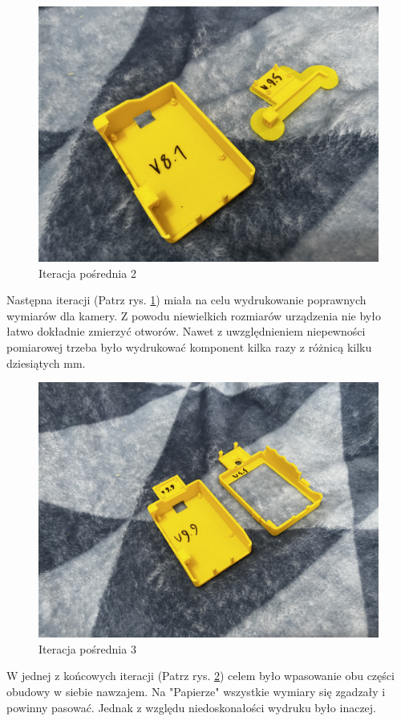 \documentclass[a4paper,12pt,reqno]{article}
\begin{document}
\begin{figure}[H]%
\centering
\includegraphics[width=0.8\columnwidth]{imgs/print_2.jpg}
\caption{Iteracja pośrednia 2 \label{PDCA_02}}
\quad
\end{figure}

Następna iteracji (Patrz rys. \ref{PDCA_02}) miała na celu wydrukowanie poprawnych wymiarów dla kamery. Z powodu niewielkich rozmiarów urządzenia nie było łatwo dokładnie zmierzyć otworów. Nawet z uwzględnieniem niepewności pomiarowej trzeba było wydrukować komponent kilka razy z różnicą kilku dziesiątych mm.

\begin{figure}[H]%
\centering
\includegraphics[width=0.8\columnwidth]{imgs/print_3.jpg}
\caption{Iteracja pośrednia 3 \label{PDCA_03}}
\quad
\end{figure}

W jednej z końcowych iteracji (Patrz rys. \ref{PDCA_03}) celem było wpasowanie obu części obudowy w siebie nawzajem. Na "Papierze" wszystkie wymiary się zgadzały i powinny pasować. Jednak z względu niedoskonałości wydruku było inaczej.
\end{document}
